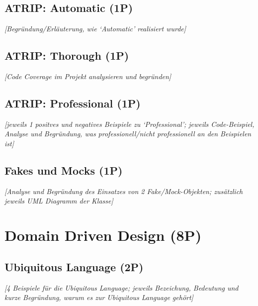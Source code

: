 \section{ATRIP: Automatic (1P)}
\emph{[Begründung/Erläuterung, wie ‘Automatic’ realisiert wurde]}

\section{ATRIP: Thorough (1P)}
\emph{[Code Coverage im Projekt analysieren und begründen]}

\section{ATRIP: Professional (1P)}
\emph{[jeweils 1 positves und negatives Beispiele zu ‘Professional’; jeweils Code-Beispiel, Analyse und
Begründung, was professionell/nicht professionell an den Beispielen ist]}

\section{Fakes und Mocks (1P)}
\emph{[Analyse und Begründung des Einsatzes von 2 Fake/Mock-Objekten; zusätzlich jeweils UML
Diagramm der Klasse]}

\newpage
\titlespacing*{\chapter}{0pt}{-30mm}{10pt}
  
\chapter{Domain Driven Design (8P)}
\pagestyle{scrheadings}
\clearscrheadfoot
{}
\setcounter{page}{6}
\ofoot[\pagemark]{\pagemark}
\onehalfspacing

\section{Ubiquitous Language (2P)}
\emph{[4 Beispiele für die Ubiquitous Language; jeweils Bezeichung, Bedeutung und kurze Begründung,
warum es zur Ubiquitous Language gehört]}

